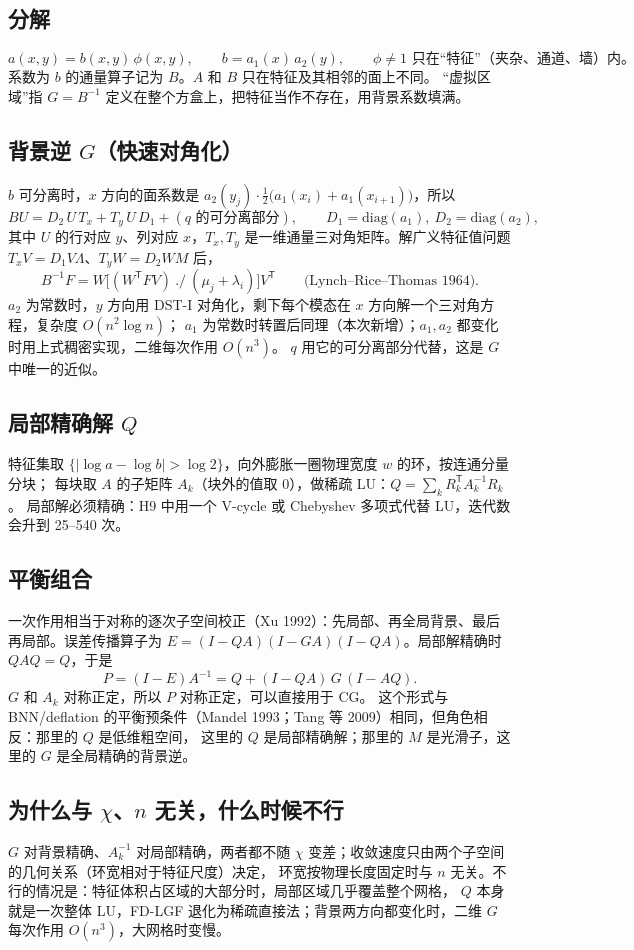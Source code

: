 \documentclass[11pt,a4paper]{ctexart}
\begin{document}
\subsection{分解}
\[
  a(x,y)=b(x,y)\,\phi(x,y),\qquad b=a_1(x)\,a_2(y),\qquad \phi\neq1 \text{ 只在“特征”（夹杂、通道、墙）内。}
\]
系数为 $b$ 的通量算子记为 $B$。$A$ 和 $B$ 只在特征及其相邻的面上不同。
“虚拟区域”指 $G=B^{-1}$ 定义在整个方盒上，把特征当作不存在，用背景系数填满。

\subsection{背景逆 $G$（快速对角化）}
$b$ 可分离时，$x$ 方向的面系数是 $a_2(y_j)\cdot\tfrac12\big(a_1(x_i)+a_1(x_{i+1})\big)$，所以
\[
  BU = D_2\,U\,T_x + T_y\,U\,D_1 + (\text{$q$ 的可分离部分}),\qquad D_1=\mathrm{diag}(a_1),\ D_2=\mathrm{diag}(a_2),
\]
其中 $U$ 的行对应 $y$、列对应 $x$，$T_x,T_y$ 是一维通量三对角矩阵。解广义特征值问题 $T_xV=D_1V\Lambda$、$T_yW=D_2WM$ 后，
\[
  B^{-1}F = W\Big[(W^{\mathsf T}FV)\ ./\ (\mu_j+\lambda_i)\Big]V^{\mathsf T}\qquad\text{(Lynch--Rice--Thomas 1964)}.
\]
$a_2$ 为常数时，$y$ 方向用 DST-I 对角化，剩下每个模态在 $x$ 方向解一个三对角方程，复杂度 $O(n^2\log n)$；
$a_1$ 为常数时转置后同理（本次新增）；$a_1,a_2$ 都变化时用上式稠密实现，二维每次作用 $O(n^3)$。
$q$ 用它的可分离部分代替，这是 $G$ 中唯一的近似。

\subsection{局部精确解 $Q$}
特征集取 $\{|\log a-\log b|>\log 2\}$，向外膨胀一圈物理宽度 $w$ 的环，按连通分量分块；
每块取 $A$ 的子矩阵 $A_k$（块外的值取 0），做稀疏 LU：$Q=\sum_kR_k^{\mathsf T}A_k^{-1}R_k$。
局部解必须精确：H9 中用一个 V-cycle 或 Chebyshev 多项式代替 LU，迭代数会升到 25--540 次。

\subsection{平衡组合}
一次作用相当于对称的逐次子空间校正（Xu 1992）：先局部、再全局背景、最后再局部。误差传播算子为
$E=(I-QA)(I-GA)(I-QA)$。局部解精确时 $QAQ=Q$，于是
\[
  P=(I-E)A^{-1}=Q+(I-QA)\,G\,(I-AQ).
\]
$G$ 和 $A_k$ 对称正定，所以 $P$ 对称正定，可以直接用于 CG。
这个形式与 BNN/deflation 的平衡预条件（Mandel 1993；Tang 等 2009）相同，但角色相反：那里的 $Q$ 是低维粗空间，
这里的 $Q$ 是局部精确解；那里的 $M$ 是光滑子，这里的 $G$ 是全局精确的背景逆。

\subsection{为什么与 $\chi$、$n$ 无关，什么时候不行}
$G$ 对背景精确、$A_k^{-1}$ 对局部精确，两者都不随 $\chi$ 变差；收敛速度只由两个子空间的几何关系（环宽相对于特征尺度）决定，
环宽按物理长度固定时与 $n$ 无关。不行的情况是：特征体积占区域的大部分时，局部区域几乎覆盖整个网格，
$Q$ 本身就是一次整体 LU，FD-LGF 退化为稀疏直接法；背景两方向都变化时，二维 $G$ 每次作用 $O(n^3)$，大网格时变慢。
\end{document}
